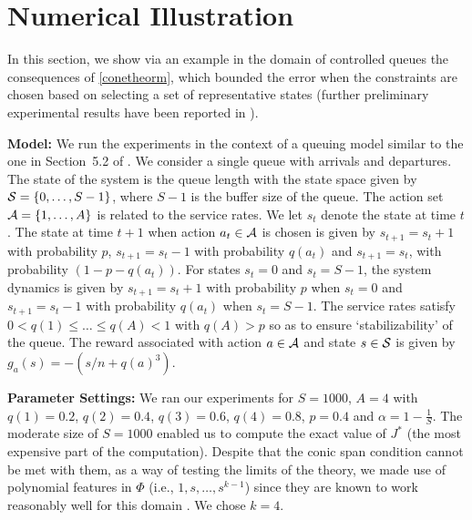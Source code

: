 \section{Numerical Illustration}
In this section, we show via an example in the domain of controlled queues the consequences of \cref{conetheorm},
which bounded the error when the constraints are chosen based on selecting a set of representative states
 (further preliminary experimental results have been reported in \cite{aaaipaper}).

\textbf{Model:} We run the experiments in the context of a queuing model similar to the one in Section~5.2 of \cite{ALP}. We consider a single queue with arrivals and departures. The state of the system is the queue length with the state space given by $\S=\{0,\ldots,S-1\}$, where $S-1$ is the buffer size of the queue. The action set $\A=\{1,\ldots,A\}$ is related to the service rates. We let $s_t$ denote the state at time $t$. The state at time $t+1$ when action $a_t \in \A$ is chosen is given by $s_{t+1}= s_{t}+1$ with probability $p$, $s_{t+1}= s_{t}-1$ with probability $q(a_t)$ and $s_{t+1}= s_t$, with probability $(1-p-q(a_t))$. For states $s_t=0$ and $s_t=S-1$, the system dynamics is given by $s_{t+1}= s_{t}+1$ with probability $p$ when $s_t=0$ and $s_{t+1}=s_t-1$ with probability $q(a_t)$ when $s_t=S-1$. The service rates satisfy $0<q(1)\leq \ldots\leq q(A)<1$ with $q(A)>p$ so as to ensure `stabilizability' of the queue.
The reward associated with  action $a \in \A$ and state $s\in \S$ is given by $g_a(s)=-(s/n+q(a)^3)$.

\textbf{Parameter Settings:} We ran our experiments for $S=1000$, $A=4$ with $q(1)=0.2$, $q(2)=0.4$, $q(3)=0.6$, $q(4)=0.8$, $p=0.4$ and $\alpha=1-\frac{1}{S}$.
The moderate size of $S=1000$ enabled us to compute the exact value of $J^*$ (the most expensive part of the computation). 
Despite that the conic span condition cannot be met with them, as a way of testing the limits of the theory,
we made use of polynomial features in $\Phi$ (i.e., $1,s,\ldots,s^{k-1}$) 
since they are known to work reasonably well for this domain \cite{ALP}.
We chose $k=4$. %

